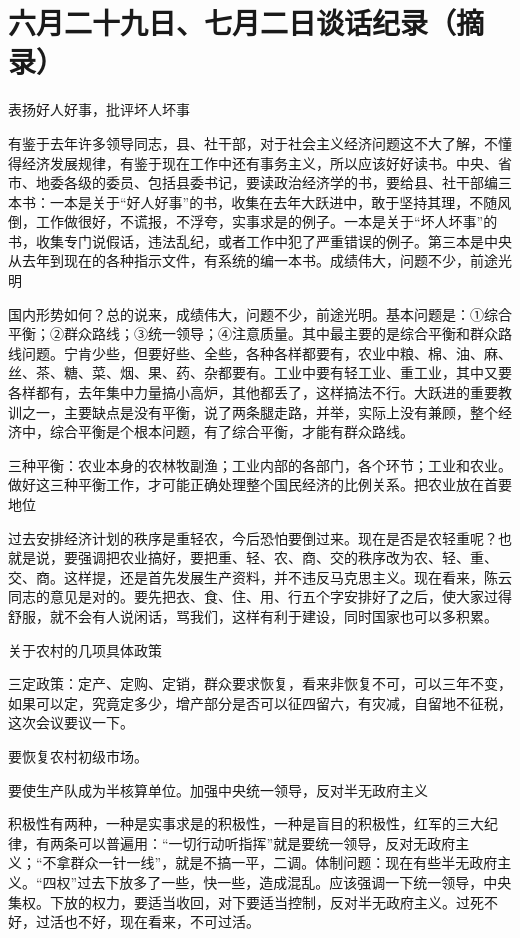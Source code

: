 \section[六月二十九日、七月二日谈话纪录（摘录） ]{六月二十九日、七月二日谈话纪录（摘录） }


表扬好人好事，批评坏人坏事

有鉴于去年许多领导同志，县、社干部，对于社会主义经济问题这不大了解，不懂得经济发展规律，有鉴于现在工作中还有事务主义，所以应该好好读书。中央、省市、地委各级的委员、包括县委书记，要读政治经济学的书，要给县、社干部编三本书：一本是关于“好人好事”的书，收集在去年大跃进中，敢于坚持其理，不随风倒，工作做很好，不谎报，不浮夸，实事求是的例子。一本是关于“坏人坏事”的书，收集专门说假话，违法乱纪，或者工作中犯了严重错误的例子。第三本是中央从去年到现在的各种指示文件，有系统的编一本书。成绩伟大，问题不少，前途光明

国内形势如何？总的说来，成绩伟大，问题不少，前途光明。基本问题是：①综合平衡；②群众路线；③统一领导；④注意质量。其中最主要的是综合平衡和群众路线问题。宁肯少些，但要好些、全些，各种各样都要有，农业中粮、棉、油、麻、丝、茶、糖、菜、烟、果、药、杂都要有。工业中要有轻工业、重工业，其中又要各样都有，去年集中力量搞小高炉，其他都丢了，这样搞法不行。大跃进的重要教训之一，主要缺点是没有平衡，说了两条腿走路，并举，实际上没有兼顾，整个经济中，综合平衡是个根本问题，有了综合平衡，才能有群众路线。

三种平衡：农业本身的农林牧副渔；工业内部的各部门，各个环节；工业和农业。做好这三种平衡工作，才可能正确处理整个国民经济的比例关系。把农业放在首要地位

过去安排经济计划的秩序是重轻农，今后恐怕要倒过来。现在是否是农轻重呢？也就是说，要强调把农业搞好，要把重、轻、农、商、交的秩序改为农、轻、重、交、商。这样提，还是首先发展生产资料，并不违反马克思主义。现在看来，陈云同志的意见是对的。要先把衣、食、住、用、行五个字安排好了之后，使大家过得舒服，就不会有人说闲话，骂我们，这样有利于建设，同时国家也可以多积累。

关于农村的几项具体政策

三定政策：定产、定购、定销，群众要求恢复，看来非恢复不可，可以三年不变，如果可以定，究竟定多少，增产部分是否可以征四留六，有灾减，自留地不征税，这次会议要议一下。

要恢复农村初级市场。

要使生产队成为半核算单位。加强中央统一领导，反对半无政府主义

积极性有两种，一种是实事求是的积极性，一种是盲目的积极性，红军的三大纪律，有两条可以普遍用：“一切行动听指挥”就是要统一领导，反对无政府主义；“不拿群众一针一线”，就是不搞一平，二调。体制问题：现在有些半无政府主义。“四权”过去下放多了一些，快一些，造成混乱。应该强调一下统一领导，中央集权。下放的权力，要适当收回，对下要适当控制，反对半无政府主义。过死不好，过活也不好，现在看来，不可过活。


